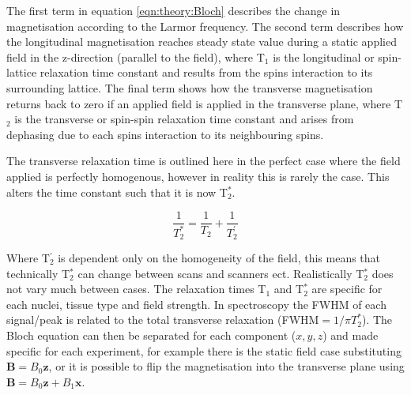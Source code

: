 The first term in equation \ref{eqn:theory:Bloch} describes the change in magnetisation according to the Larmor frequency. The second term describes how the longitudinal magnetisation reaches steady state value during a static applied field in the z-direction (parallel to the field), where T$_1$ is the longitudinal or spin-lattice relaxation time constant and results from the spins interaction to its surrounding lattice. The final term shows how the transverse magnetisation returns back to zero if an applied field is applied in the transverse plane, where T$_2$ is the transverse or spin-spin relaxation time constant and arises from dephasing due to each spins interaction to its neighbouring spins. 

The transverse relaxation time is outlined here in the perfect case where the field applied is perfectly homogenous, however in reality this is rarely the case. This alters the time constant such that it is now T$_2^*$.

\begin{equation}
    \frac{1}{T_2^*} = \frac{1}{T_2} + \frac{1}{T_2^{'}}
    \label{eqn:theory:trans}
\end{equation}

Where T$_2^{'}$ is dependent only on the homogeneity of the field, this means that technically T$_2^*$ can change between scans and scanners ect. Realistically T$_2^*$ does not vary much between cases. The relaxation times T$_1$ and T$_2^*$ are specific for each nuclei, tissue type and field strength. In spectroscopy the \ac{FWHM} of each signal/peak is related to the total transverse relaxation (\ac{FWHM}$ = 1 / \pi T_2^*$). The Bloch equation can then be separated for each component ($x,y,z$) and made specific for each experiment, for example there is the static field case substituting $\mathbf{B}=B_0\mathbf{z}$, or it is possible to flip the magnetisation into the transverse plane using $\mathbf{B}=B_0\mathbf{z}+B_1\mathbf{x}$. 

